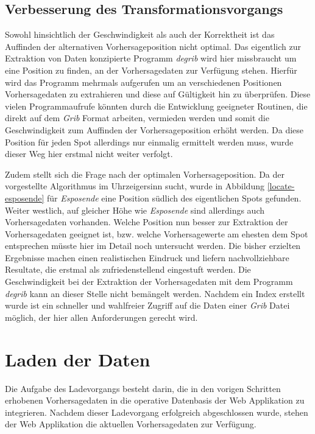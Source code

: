 \subsection{Verbesserung des Transformationsvorgangs}
Sowohl hinsichtlich der Geschwindigkeit als auch der Korrektheit ist
das Auffinden der alternativen Vorhersageposition nicht optimal. Das
eigentlich zur Extraktion von Daten konzipierte Programm
\textit{degrib} wird hier missbraucht um eine Position zu finden, an
der Vorhersagedaten zur Verfügung stehen. Hierfür wird das Programm
mehrmals aufgerufen um an verschiedenen Positionen Vorhersagedaten zu
extrahieren und diese auf Gültigkeit hin zu überprüfen. Diese vielen
Programmaufrufe könnten durch die Entwicklung geeigneter Routinen, die
direkt auf dem \textit{Grib} Format arbeiten, vermieden werden und
somit die Geschwindigkeit zum Auffinden der Vorhersageposition erhöht
werden. Da diese Position für jeden Spot allerdings nur einmalig
ermittelt werden muss, wurde dieser Weg hier erstmal nicht weiter
verfolgt.

Zudem stellt sich die Frage nach der optimalen Vorhersageposition. Da
der vorgestellte Algorithmus im Uhrzeigersinn sucht, wurde in
Abbildung \ref{locate-esposende} für \textit{Esposende} eine Position
südlich des eigentlichen Spots gefunden. Weiter westlich, auf gleicher
Höhe wie \textit{Esposende} sind allerdings auch Vorhersagedaten
vorhanden. Welche Position nun besser zur Extraktion der
Vorhersagedaten geeignet ist, bzw. welche Vorhersagewerte am ehesten
dem Spot entsprechen müsste hier im Detail noch untersucht werden. Die
bisher erzielten Ergebnisse machen einen realistischen Eindruck und
liefern nachvollziehbare Resultate, die erstmal als zufriedenstellend
eingestuft werden. Die Geschwindigkeit bei der Extraktion der
Vorhersagedaten mit dem Programm \textit{degrib} kann an dieser Stelle
nicht bemängelt werden. Nachdem ein Index erstellt wurde ist ein
schneller und wahlfreier Zugriff auf die Daten einer \textit{Grib}
Datei möglich, der hier allen Anforderungen gerecht wird.

\section{Laden der Daten}
Die Aufgabe des Ladevorgangs besteht darin, die in den vorigen
Schritten erhobenen Vorhersagedaten in die operative Datenbasis der
Web Applikation zu integrieren. Nachdem dieser Ladevorgang erfolgreich
abgeschlossen wurde, stehen der Web Applikation die aktuellen
Vorhersagedaten zur Verfügung. 

